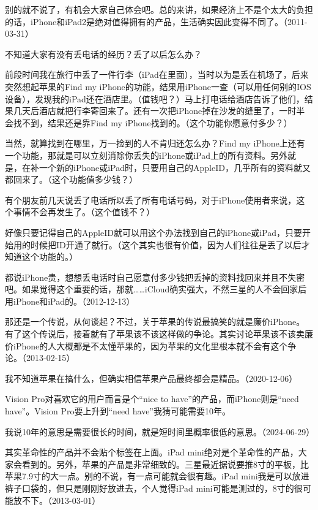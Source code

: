别的就不说了，有机会大家自己体会吧。总的来讲，如果经济上不是个太大的负担的话，iPhone和iPad2是绝对值得拥有的产品，生活确实因此变得不同了。（2011-03-31）

不知道大家有没有丢电话的经历？丢了以后怎么办？

前段时间我在旅行中丢了一件行李（iPad在里面），当时以为是丢在机场了，后来突然想起苹果的Find my iPhone的功能，结果用iPhone一查（可以用任何别的IOS设备），发现我的iPad还在酒店里。（值钱吧？）马上打电话给酒店告诉了他们，结果几天后酒店就把行李寄回来了。还有一次把iPhone掉在沙发的缝里了，一时半会找不到，结果还是靠Find my iPhone找到的。（这个功能你愿意付多少？）

当然，就算找到在哪里，万一捡到的人不肯归还怎么办？Find my iPhone上还有一个功能，那就是可以立刻消除你丢失的iPhone或iPad上的所有资料。另外就是，在补一个新的iPhone或iPad时，只要用自己的AppleID，几乎所有的资料就又都回来了。（这个功能值多少钱？）

有个朋友前几天说丢了电话所以丢了所有电话号码，对于iPhone使用者来说，这个事情不会再发生了。（这个值钱不？）

好像只要记得自己的AppleID就可以用这个办法找到自己的iPhone或iPad，只要开始用的时候把ID开通了就行。（这个其实也很有价值，因为人们往往是丢了以后才知道这个功能的。）

都说iPhone贵，想想丢电话时自己愿意付多少钱把丢掉的资料找回来并且不失密吧。如果觉得这个重要的话，那就……iCloud确实强大，不然三星的人不会回家后用iPhone和iPad的。（2012-12-13）


那还是一个传说，从何谈起？不过，关于苹果的传说最搞笑的就是廉价iPhone。有了这个传说后，接着就有了苹果该不该这样做的争论。其实讨论苹果该不该卖廉价iPhone的人大概都是不太懂苹果的，因为苹果的文化里根本就不会有这个争论。（2013-02-15）


我不知道苹果在搞什么，但确实相信苹果产品最终都会是精品。（2020-12-06）

Vision Pro对喜欢它的用户而言是个“nice to have”的产品，而iPhone则是“need have”。Vision Pro要上升到“need have”我猜可能需要10年。

我说10年的意思是需要很长的时间，就是短时间里概率很低的意思。（2024-06-29）


其实革命性的产品并不会贴个标签在上面。iPad mini绝对是个革命性的产品，大家会看到的。另外，苹果的产品是非常细致的。三星最近据说要推8寸的平板，比苹果7.9寸的大一点。别的不说，有一点可能就会很有趣。iPad mini我是可以放进裤子口袋的，但只是刚刚好放进去，个人觉得iPad mini可能是测过的，8寸的很可能放不下。（2013-03-01）

